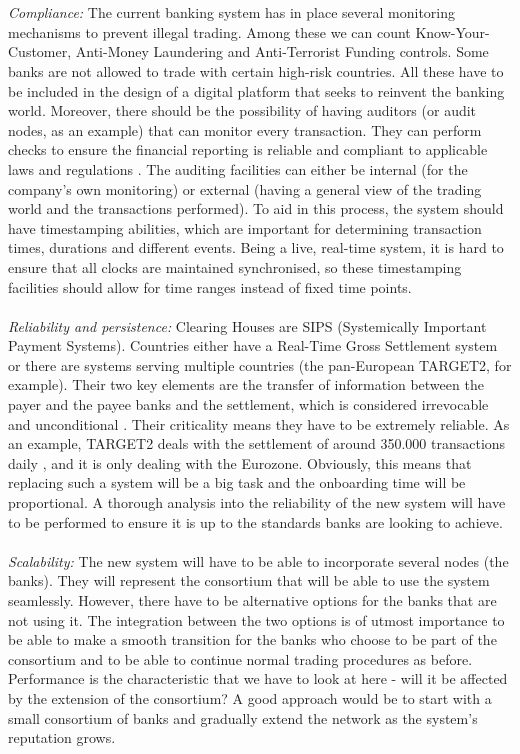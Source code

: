 \documentclass[12pt,twoside]{article}
\begin{document}
\\ \\
\textit{Compliance:} The current banking system has in place several monitoring mechanisms to prevent illegal trading. Among these we can count Know-Your-Customer, Anti-Money Laundering and Anti-Terrorist Funding controls. Some banks are not allowed to trade with certain high-risk countries. All these have to be included in the design of a digital platform that seeks to reinvent the banking world. Moreover, there should be the possibility of having auditors (or audit nodes, as an example) that can monitor every transaction. They can perform checks to ensure the financial reporting is reliable and compliant to applicable laws and regulations \cite{GS:Audit}. The auditing facilities can either be internal (for the company's own monitoring) or external (having a general view of the trading world and the transactions performed). To aid in this process, the system should have timestamping abilities, which are important for determining transaction times, durations and different events. Being a live, real-time system, it is hard to ensure that all clocks are maintained synchronised, so these timestamping facilities should allow for time ranges instead of fixed time points.
\\ \\
\textit{Reliability and persistence:} Clearing Houses are SIPS (Systemically Important Payment Systems). Countries either have a Real-Time Gross Settlement system or there are systems serving multiple countries (the pan-European TARGET2, for example). Their two key elements are the transfer of information between the payer and the payee banks and the settlement, which is considered irrevocable and unconditional \cite{RTGS}. Their criticality means they have to be extremely reliable. As an example, TARGET2 deals with the settlement of around 350.000 transactions daily \cite{TARGET2}, and it is only dealing with the Eurozone. Obviously, this means that replacing such a system will be a big task and the onboarding time will be proportional. A thorough analysis into the reliability of the new system will have to be performed to ensure it is up to the standards banks are looking to achieve.
\\ \\
\textit{Scalability:} The new system will have to be able to incorporate several nodes (the banks). They will represent the consortium that will be able to use the system seamlessly. However, there have to be alternative options for the banks that are not using it. The integration between the two options is of utmost importance to be able to make a smooth transition for the banks who choose to be part of the consortium and to be able to continue normal trading procedures as before. Performance is the characteristic that we have to look at here - will it be affected by the extension of the consortium? A good approach would be to start with a small consortium of banks and gradually extend the network as the system's reputation grows.
\end{document}
